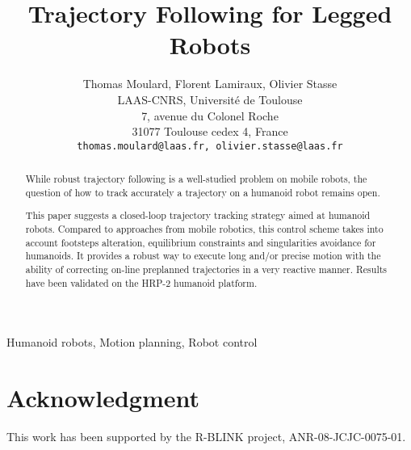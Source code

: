 \documentclass[conference,final]{IEEEtran}
\begin{document}
\title{Trajectory Following for Legged Robots}

\author{Thomas Moulard, Florent Lamiraux, Olivier Stasse\\
  LAAS-CNRS, Universit\'e de Toulouse\\
  7, avenue du Colonel Roche\\
  31077 Toulouse cedex 4, France\\
  \tt\small thomas.moulard@laas.fr, \tt\small olivier.stasse@laas.fr\\
}


\maketitle


\begin{abstract}
  While robust trajectory following is a well-studied problem on
  mobile robots, the question of how to track accurately a trajectory
  on a humanoid robot remains open.

  This paper suggests a closed-loop trajectory tracking strategy
  aimed at humanoid robots. Compared to approaches from mobile
  robotics, this control scheme takes into account footsteps
  alteration, equilibrium constraints and singularities avoidance for
  humanoids. It provides a robust way to execute long and/or precise
  motion with the ability of correcting on-line preplanned
  trajectories in a very reactive manner. Results have been validated
  on the HRP-2 humanoid platform.
\end{abstract}

\begin{IEEEkeywords}
  Humanoid robots, Motion planning, Robot control
\end{IEEEkeywords}

\IEEEpeerreviewmaketitle









\section*{Acknowledgment}

This work has been supported by the R-BLINK project,
ANR-08-JCJC-0075-01.



\end{document}
